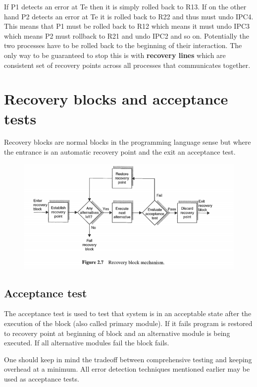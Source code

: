 If P1 detects an error at Te then it is simply rolled back to R13. If on the other hand P2 detects an error at Te it is rolled back to R22 and thus must undo IPC4. This means that P1 must be rolled back to R12 which means it must undo IPC3 which means P2 must rollback to R21 and undo IPC2 and so on. Potentially the two processes have to be rolled back to the beginning of their interaction. The only way to be guaranteed to stop this is with \textbf{recovery lines} which are consistent set of recovery points across all processes that communicates together.

\section{Recovery blocks and acceptance tests}
Recovery blocks are normal blocks in the programming language sense but where the entrance is an automatic recovery point and the exit an acceptance test. 
\begin{figure}[H]
\centering
\includegraphics[width=\textwidth]{figures/Fault_Tolerance/recovery_block_mechanism.PNG}
\end{figure}

\subsection{Acceptance test}
The acceptance test is used to test that system is in an acceptable state after the execution of the block (also called primary module). If it fails program is restored to recovery point at beginning of block and an alternative module is being executed. If all alternative modules fail the block fails.

One should keep in mind the tradeoff between comprehensive testing and keeping overhead at a minimum. All error detection techniques mentioned earlier may be used as acceptance tests.

